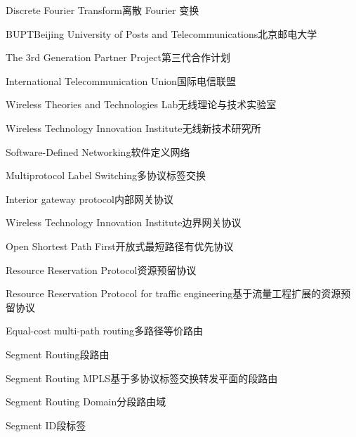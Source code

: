 

{Discrete Fourier Transform}{离散 Fourier 变换}

{BUPT}{Beijing University of Posts and Telecommunications}{北京邮电大学}

{The 3rd Generation Partner Project}{第三代合作计划}

{International Telecommunication Union}{国际电信联盟}

{Wireless Theories and Technologies Lab}{无线理论与技术实验室}

{Wireless Technology Innovation Institute}{无线新技术研究所}

{Software-Defined Networking}{软件定义网络}

{Multiprotocol Label Switching}{多协议标签交换}

{Interior gateway protocol}{内部网关协议}

{Wireless Technology Innovation Institute}{边界网关协议}

{Open Shortest Path First}{开放式最短路径有优先协议}

{Resource Reservation Protocol}{资源预留协议}

{Resource Reservation Protocol for traffic engineering}{基于流量工程扩展的资源预留协议}

{Equal-cost multi-path routing}{多路径等价路由}

{Segment Routing}{段路由}

{Segment Routing MPLS}{基于多协议标签交换转发平面的段路由}

{Segment Routing Domain}{分段路由域}

{Segment ID}{段标签}

